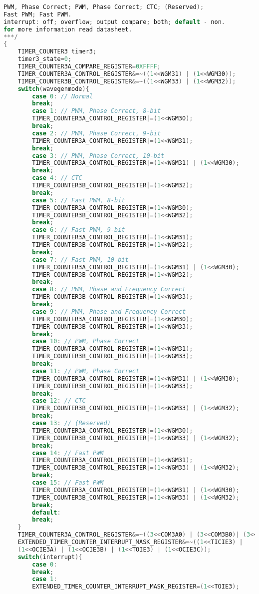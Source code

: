\begin{lstlisting}[language=C, caption={atmega128timer.c}, label=atmega128timer-c, captionpos=b]
PWM, Phase Correct; PWM, Phase Correct; CTC; (Reserved);
Fast PWM; Fast PWM.
interrupt: off; overflow; output compare; both; default - non.
for more information read datasheet.
***/
{
	TIMER_COUNTER3 timer3;
	timer3_state=0;
	TIMER_COUNTER3A_COMPARE_REGISTER=0XFFFF;
	TIMER_COUNTER3A_CONTROL_REGISTER&=~((1<<WGM31) | (1<<WGM30));
	TIMER_COUNTER3B_CONTROL_REGISTER&=~((1<<WGM33) | (1<<WGM32));
	switch(wavegenmode){
		case 0: // Normal
		break;
		case 1: // PWM, Phase Correct, 8-bit
		TIMER_COUNTER3A_CONTROL_REGISTER|=(1<<WGM30);
		break;
		case 2:	// PWM, Phase Correct, 9-bit
		TIMER_COUNTER3A_CONTROL_REGISTER|=(1<<WGM31);
		break;
		case 3:	// PWM, Phase Correct, 10-bit
		TIMER_COUNTER3A_CONTROL_REGISTER|=(1<<WGM31) | (1<<WGM30);
		break;
		case 4:	// CTC
		TIMER_COUNTER3B_CONTROL_REGISTER|=(1<<WGM32);
		break;
		case 5:	// Fast PWM, 8-bit
		TIMER_COUNTER3A_CONTROL_REGISTER|=(1<<WGM30);
		TIMER_COUNTER3B_CONTROL_REGISTER|=(1<<WGM32);
		break;
		case 6:	// Fast PWM, 9-bit
		TIMER_COUNTER3A_CONTROL_REGISTER|=(1<<WGM31);
		TIMER_COUNTER3B_CONTROL_REGISTER|=(1<<WGM32);
		break;
		case 7:	// Fast PWM, 10-bit
		TIMER_COUNTER3A_CONTROL_REGISTER|=(1<<WGM31) | (1<<WGM30);
		TIMER_COUNTER3B_CONTROL_REGISTER|=(1<<WGM32);
		break;
		case 8:	// PWM, Phase and Frequency Correct
		TIMER_COUNTER3B_CONTROL_REGISTER|=(1<<WGM33);
		break;
		case 9:	// PWM, Phase and Frequency Correct
		TIMER_COUNTER3A_CONTROL_REGISTER|=(1<<WGM30);
		TIMER_COUNTER3B_CONTROL_REGISTER|=(1<<WGM33);
		break;
		case 10: // PWM, Phase Correct
		TIMER_COUNTER3A_CONTROL_REGISTER|=(1<<WGM31);
		TIMER_COUNTER3B_CONTROL_REGISTER|=(1<<WGM33);
		break;
		case 11: // PWM, Phase Correct
		TIMER_COUNTER3A_CONTROL_REGISTER|=(1<<WGM31) | (1<<WGM30);
		TIMER_COUNTER3B_CONTROL_REGISTER|=(1<<WGM33);
		break;
		case 12: // CTC
		TIMER_COUNTER3B_CONTROL_REGISTER|=(1<<WGM33) | (1<<WGM32);
		break;
		case 13: // (Reserved)
		TIMER_COUNTER3A_CONTROL_REGISTER|=(1<<WGM30);
		TIMER_COUNTER3B_CONTROL_REGISTER|=(1<<WGM33) | (1<<WGM32);
		break;
		case 14: // Fast PWM
		TIMER_COUNTER3A_CONTROL_REGISTER|=(1<<WGM31);
		TIMER_COUNTER3B_CONTROL_REGISTER|=(1<<WGM33) | (1<<WGM32);
		break;
		case 15: // Fast PWM
		TIMER_COUNTER3A_CONTROL_REGISTER|=(1<<WGM31) | (1<<WGM30);
		TIMER_COUNTER3B_CONTROL_REGISTER|=(1<<WGM33) | (1<<WGM32);
		break;
		default:
		break;
	}
	TIMER_COUNTER3A_CONTROL_REGISTER&=~((3<<COM3A0) | (3<<COM3B0)| (3<<COM3C0));
	EXTENDED_TIMER_COUNTER_INTERRUPT_MASK_REGISTER&=~((1<<TICIE3) |
	(1<<OCIE3A) | (1<<OCIE3B) | (1<<TOIE3) | (1<<OCIE3C));
	switch(interrupt){
		case 0:
		break;
		case 1:
		EXTENDED_TIMER_COUNTER_INTERRUPT_MASK_REGISTER=(1<<TOIE3);

\end{lstlisting}
